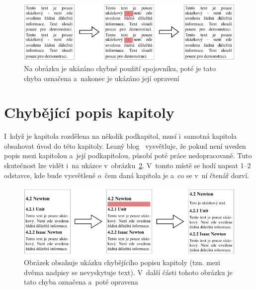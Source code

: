 \begin{figure}[H]
    \centering
    \includegraphics[width=\linewidth]{obrazky-figures/dash_example.pdf}
    \caption{
        Na obrázku je ukázáno chybné použití spojovníku, poté je tato chyba
        označena a~nakonec je ukázáno její opravení
    }
    \label{pic_hyphen}
\end{figure}


\section{Chybějící popis kapitoly}

I~když je kapitola rozdělena na několik podkapitol, musí i~samotná kapitola
obsahovat úvod do této kapitoly. Leaný blog~\cite{Leany_blog} vysvětluje, že 
pokud není uveden
popis mezi kapitolou a~její podkapitolou, působí poté práce nedopracovaně. Tuto
skutečnost lze vidět i~na ukázce v~obrázku~\ref{pic_chapter_introduction}. V~tomto místě
se hodí napsat 1--2 odstavce, kde bude vysvětlené o~čem daná kapitola je a~co se
v~ní čtenář dozví.

\begin{figure}[H]
    \centering
    \includegraphics[width=\linewidth]{obrazky-figures/chapter_introduction_example.pdf}
    \caption{
        Obrázek obsahuje ukázku chybějícího popisu kapitoly (tzn. mezi dvěma
        nadpisy se nevyskytuje text). V~další části tohoto obrázku je tato 
        chyba označena a~poté opravena
    }
    \label{pic_chapter_introduction}
\end{figure}


